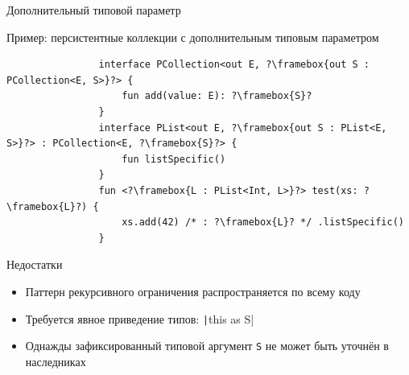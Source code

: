 \documentclass[usenames, dvipsnames]{beamer}
\begin{document}
    \begin{frame}[fragile]{Дополнительный типовой параметр}
        \begin{block}{Пример: персистентные коллекции с дополнительным типовым параметром}
            \begin{verbatim}
                interface PCollection<out E, ?\framebox{out S : PCollection<E, S>}?> {
                    fun add(value: E): ?\framebox{S}?
                }
                interface PList<out E, ?\framebox{out S : PList<E, S>}?> : PCollection<E, ?\framebox{S}?> {
                    fun listSpecific()
                }
                fun <?\framebox{L : PList<Int, L>}?> test(xs: ?\framebox{L}?) {
                    xs.add(42) /* : ?\framebox{L}? */ .listSpecific()
                }
            \end{verbatim}
        \end{block}

        \begin{block}{Недостатки}
            \begin{itemize}
                \item Паттерн рекурсивного ограничения распространяется по всему коду
                \item Требуется явное приведение типов: \texttt|this as S|
                \item Однажды зафиксированный типовой аргумент \texttt{S} не может быть уточнён в наследниках
            \end{itemize}
        \end{block}
    \end{frame}
\end{document}
